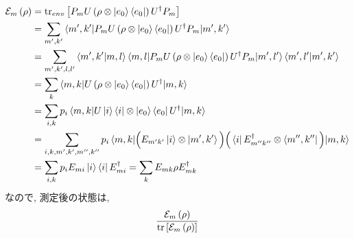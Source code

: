 \begin{ex}
    \label{ex8.9}
    \begin{align*}
        \mathcal{E}_m \left( \rho \right)
         & = \mathrm{tr}_{env} \left[ P_m U \left(\rho \otimes \ket{e_0} \bra{e_0} \right) U^\dagger P_m\right] \\
         & =
        \sum_{m',k'}
        \braket{
            m', k'
            |P_m U \left(\rho \otimes \ket{e_0} \bra{e_0} \right) U^\dagger P_m|
            m', k'
        }
        \\
         & =
        \sum_{m',k',l,l'}
        \braket{m', k'|m,l}
        \braket{
            m,l
            |P_m U \left(\rho \otimes \ket{e_0} \bra{e_0} \right) U^\dagger P_m|
            m', l'
        }
        \braket{m', l'|m',k'}
        \\
         & =
        \sum_{k}
        \braket{
            m,k
            |U \left(\rho \otimes \ket{e_0} \bra{e_0} \right) U^\dagger |
            m, k
        }
        \\
         & =
        \sum_{i,k}
        p_i
        \braket{
            m,k
            |U \ket{i}\bra{i} \otimes \ket{e_0}\bra{e_0} U^\dagger |
            m, k
        }
        \\
         & =
        \sum_{i,k, m', k', m'', k''}
        p_i
        \braket{
            m,k
            |
            \Big( E_{m'k'} \ket{i} \otimes \ket{m',k'} \Big)
            \Big( \bra{i} E_{m''k''}^\dagger \otimes \bra{m'',k''} \Big)
            |
            m, k
        }
        \\
         & =
        \sum_{i,k}
        p_i
        E_{mi} \ket{i}
        \bra{i} E_{mi}^\dagger
        =
        \sum_{k}
        E_{mk} \rho E_{mk}^\dagger
    \end{align*}
    なので, 測定後の状態は,
    \begin{align*}
        \frac{\mathcal{E}_m \left(\rho\right)}
        {\mathrm{tr}\left[ \mathcal{E}_m\left(\rho\right)\right]}
    \end{align*}
\end{ex}

